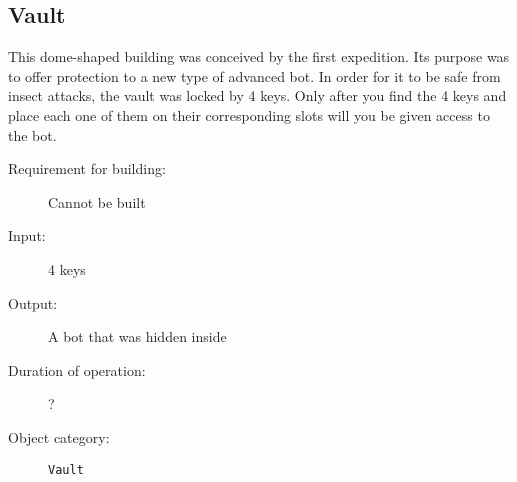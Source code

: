 \subsection{Vault}

This dome-shaped building was conceived by the first expedition. Its purpose was to offer protection to a new type of advanced bot. In order for it to be safe from insect attacks, the vault was locked by 4 keys. Only after you find the 4 keys and place each one of them on their corresponding slots will you be given access to the bot.

\begin{description}
    \item[Requirement for building:] Cannot be built
    \item[Input:] 4 keys
    \item[Output:] A bot that was hidden inside
    \item[Duration of operation:] ?
    \item[Object category:] \texttt{Vault}
\end{description}
